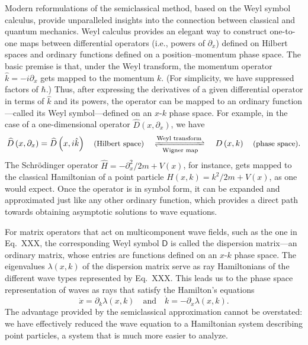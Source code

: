 Modern reformulations of the semiclassical method, based on the Weyl symbol calculus, provide unparalleled insights into the connection between classical and quantum mechanics.
Weyl calculus provides an elegant way to construct one-to-one maps between differential operators (i.e., powers of $\partial_{x}$) defined on Hilbert spaces and ordinary functions defined on a position--momentum phase space.
The basic premise is that, under the Weyl transform, the momentum operator $\hat{k} = -i\partial_{x}$ gets mapped to the momentum $k$.
(For simplicity, we have suppressed factors of $\hbar$.)
Thus, after expressing the derivatives of a given differential operator in terms of $\hat{k}$ and its powers, the operator can be mapped to an ordinary function---called its Weyl symbol---defined on an $x$-$k$ phase space.
For example, in the case of a one-dimensional operator $\hat{D}(x, \partial_{x})$, we have
%
\begin{equation}
  \widehat{D}\left(x, \partial_{x}\right) = \widehat{D}\left(x, i\hat{k}\right) \quad\text{\small(Hilbert space)} \quad\xrightleftharpoons[\text{Wigner map}]{\text{Weyl transform}}\quad D\left(x, k\right) \quad\text{\small(phase space)}.
\end{equation}
%
The Schr\"{o}dinger operator $\widehat{H} = -\partial_{x}^{2}/2m + V(x)$, for instance, gets mapped to the classical Hamiltonian of a point particle $H(x, k) = k^{2}/2m + V(x)$, as one would expect.
Once the operator is in symbol form, it can be expanded and approximated just like any other ordinary function, which provides a direct path towards obtaining asymptotic solutions to wave equations.

For matrix operators that act on multicomponent wave fields, such as the one in Eq.~XXX, the corresponding Weyl symbol $\mathsf{D}$ is called the dispersion matrix---an ordinary matrix, whose entries are functions defined on an $x$-$k$ phase space.
The eigenvalues $\lambda(x, k)$ of the dispersion matrix serve as ray Hamiltonians of the different wave types represented by Eq.~XXX.
This leads us to the phase space representation of waves as rays that satisfy the Hamilton's equations
%
\begin{equation}
\dot{x} = \partial_{k}\lambda(x,k)
\quad\text{and}\quad
\dot{k} = -\partial_{x}\lambda(x, k).
\end{equation}
%
The advantage provided by the semiclassical approximation cannot be overstated: we have effectively reduced the wave equation to a Hamiltonian system describing point particles, a system that is much more easier to analyze.

